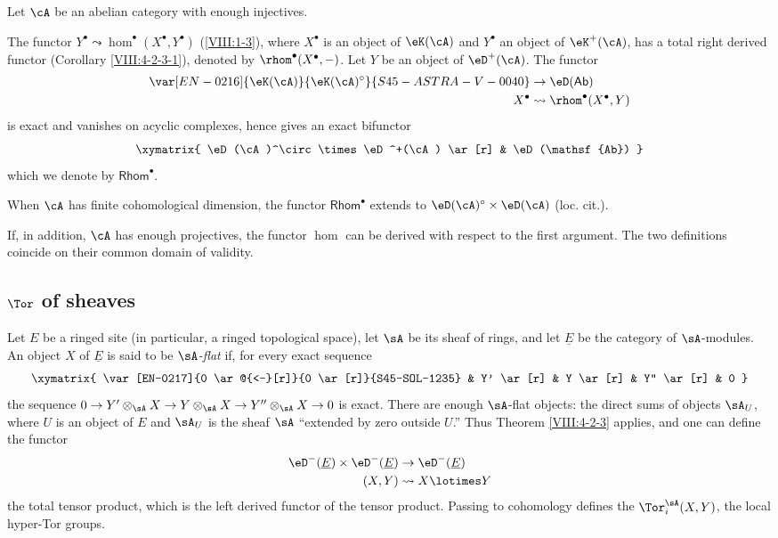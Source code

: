 Let $\cA$ be an abelian category with enough injectives.

The functor $Y^\bullet\leadsto \hom^\bullet(X^\bullet,Y^\bullet)$
(\ref{VIII:1-3}), where $X^\bullet$ is an object of $\eK(\cA)$ and
$Y^\bullet$ an object of $\eK^+(\cA)$, has a total right derived functor
(Corollary \ref{VIII:4-2-3-1}), denoted by
$\rhom^\bullet(X^\bullet,-)$. Let $Y$ be an object of $\eD^+(\cA)$.
The functor
\begin{align*}
  \var[EN-0216]{\eK(\cA)}{\eK(\cA)^\circ}{S45-ASTRA-V-0040} &\to \eD(\mathsf{Ab}) \\
  X^\bullet &\leadsto \rhom^\bullet(X^\bullet,Y)
\end{align*}
is exact and vanishes on acyclic complexes, hence gives an exact
bifunctor
\[\xymatrix{
  \eD(\cA)^\circ \times \eD^+(\cA) \ar[r]
    & \eD(\mathsf{Ab})
}\]
which we denote by $\mathsf{Rhom}^\bullet$.

When $\cA$ has finite cohomological dimension, the functor
$\mathsf{Rhom}^\bullet$ extends to
$\eD(\cA)^\circ\times \eD(\cA)$ (loc. cit.).

If, in addition, $\cA$ has enough projectives, the functor $\hom$ can be
derived with respect to the first argument. The two definitions coincide
on their common domain of validity.

\subsection{\texorpdfstring{$\Tor$}{Tor} of sheaves}\label{VIII:6-2}

Let $E$ be a ringed site (in particular, a ringed topological space), let
$\sA$ be its sheaf of rings, and let $\underline E$ be the category of
$\sA$-modules. An object $X$ of $\underline E$ is said to be
\emph{$\sA$-flat} if, for every exact sequence
\[\xymatrix{
  \var[EN-0217]{0 \ar@{<-}[r]}{0 \ar[r]}{S45-SOL-1235}
    & Y' \ar[r]
    & Y \ar[r]
    & Y'' \ar[r]
    & 0
}\]
the sequence
$0 \to Y'\otimes_\sA X \to Y\otimes_\sA X \to Y''\otimes_\sA X\to 0$
is exact. There are enough $\sA$-flat objects: the direct sums of objects
$\sA_U$, where $U$ is an object of $E$ and $\sA_U$ is the sheaf $\sA$
“extended by zero outside $U$.” Thus Theorem \ref{VIII:4-2-3} applies,
and one can define the functor
\begin{align*}
  \eD^-(\underline E) \times \eD^-(\underline E) &\to \eD^-(\underline E) \\
  (X,Y) &\leadsto X\lotimes Y
\end{align*}
the total tensor product, which is the left derived functor of the tensor
product. Passing to cohomology defines the $\Tor_i^\sA(X,Y)$, the local
hyper-Tor groups.

